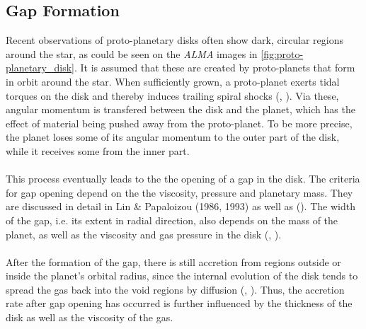     \subsection{Gap Formation}
      Recent observations of proto-planetary disks often show dark, circular 
      regions around the star, as could be seen on the \textit{ALMA} images 
      in \autoref{fig:proto-planetary_disk}.
      It is assumed that these are created by proto-planets that form in orbit 
      around the star. When sufficiently grown, a 
      proto-planet exerts tidal torques on the disk and thereby induces 
      trailing spiral shocks (\citeauthor{Kley_1999}, 
      \citeyear{Kley_1999}). Via these, angular momentum is 
      transfered between the disk and the planet, which has the effect of 
      material being pushed away from the proto-planet. To be more precise, 
      the planet loses some of its angular momentum 
      to the outer part of the disk, while it receives some from the inner 
      part. \\
      \\
      This process 
      eventually leads to the the opening of a gap in the disk. The criteria
      for gap opening depend on the the viscosity, pressure 
      and planetary mass. They are discussed in detail in 
      Lin \& Papaloizou (1986, 1993) as well as \citeauthor{Crida_2006} 
      (\citeyear{Crida_2006}). The width of the gap, i.e. 
      its extent in radial direction, also depends on the mass of the 
      planet, as well as the viscosity and gas pressure in the disk 
      (\citeauthor{Lin_Papaloizou_1993}, \citeyear{Lin_Papaloizou_1993}). \\
      \\
      After the formation of the gap, there is still accretion from regions 
      outside or inside the planet's orbital radius, since the internal 
      evolution of the disk tends to spread the gas back into the void regions
      by diffusion (\citeauthor{Kley_1999}, 
      \citeyear{Kley_1999}). Thus, the accretion rate after gap 
      opening has occurred is further influenced by the thickness of the disk 
      as well as the viscosity of the gas.
